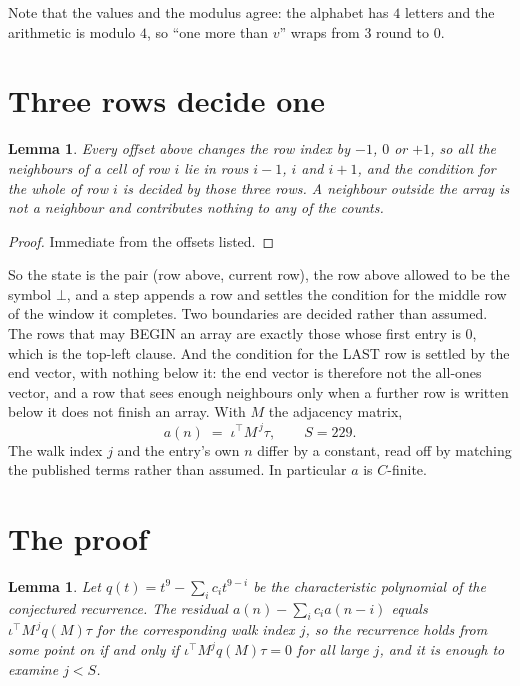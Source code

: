 \documentclass[11pt,a4paper]{article}
\theoremstyle{plain}
\newtheorem{lemma}[theorem]{Lemma}
\theoremstyle{definition}
\begin{document}
Note that the values and the modulus agree: the alphabet has $4$ letters and the arithmetic
is modulo $4$, so ``one more than $v$'' wraps from $3$ round to $0$.

\section{Three rows decide one}

\begin{lemma}\label{lem:win}
Every offset above changes the row index by $-1$, $0$ or $+1$, so all the neighbours of a cell
of row $i$ lie in rows $i-1$, $i$ and $i+1$, and the condition for the whole of row $i$ is
decided by those three rows. A neighbour outside the array is not a neighbour and contributes
nothing to any of the counts.
\end{lemma}

\begin{proof}
Immediate from the offsets listed.
\end{proof}

So the state is the pair (row above, current row), the row above allowed to be the symbol
$\bot$, and a step appends a row and settles the condition for the middle row of the window it
completes. Two boundaries are decided rather than assumed. The rows that may BEGIN an array are
exactly those whose first entry is $0$, which is the top-left clause. And the condition for the
LAST row is settled by the end vector, with nothing below it: the end vector is therefore not
the all-ones vector, and a row that sees enough neighbours only when a further row is written
below it does not finish an array. With $M$ the adjacency matrix,
\[
a(n)\;=\;\iota^{\!\top}M^{\,j}\tau ,\qquad S=229.
\]
The walk index $j$ and the entry's own $n$ differ by a constant, read off by matching the
published terms rather than assumed. In particular $a$ is $C$-finite.

\section{The proof}

\begin{lemma}\label{lem:crit}
Let $q(t)=t^{9}-\sum_i c_it^{9-i}$ be the characteristic polynomial of the
conjectured recurrence. The residual $a(n)-\sum_ic_ia(n-i)$ equals
$\iota^{\!\top}M^{\,j}q(M)\tau$ for the corresponding walk index $j$, so the recurrence
holds from some point on if and only if $\iota^{\!\top}M^{j}q(M)\tau=0$ for all large $j$,
and it is enough to examine $j<S$.
\end{lemma}
\end{document}
